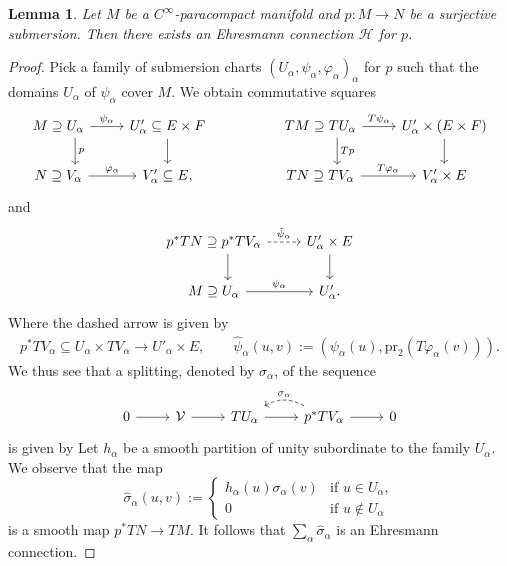 \documentclass[pdftex]{sigma}
\numberwithin{equation}{section}
\newtheorem{Lemma}[Theorem]{Lemma}
\newcommand{\cH}{\ensuremath{\mathcal{H}}}
\begin{document}
\begin{Lemma}\label{lem:ex_Ehresmann}
Let $M$ be a $C^\infty$-paracompact manifold and $p\colon M \rightarrow N$ be a surjective submersion. Then there exists an Ehresmann connection $\cH$ for $p$.
\end{Lemma}

\begin{proof}
 Pick a family of submersion charts $(U_\alpha, \psi_\alpha,\varphi_\alpha)_{\alpha}$ for $p$ such that the domains $U_\alpha$ of $\psi_\alpha$ cover $M$.
 We obtain commutative squares
 \begin{equation*}
 \begin{tikzcd}
 M \supseteq U_{\alpha} \ar[r,"\psi_{\alpha}"] \ar[d,"p", shift left=12pt] & U'_{\alpha}\subseteq E \times F \ar[d] & & TM \supseteq TU_{\alpha} \ar[r,"T\psi_{\alpha}"] \ar[d,"Tp", shift left=12pt] & U_{\alpha}' \times (E \times F) \ar[d] \\
 N \supseteq V_{\alpha} \ar[r,"\varphi_{\alpha}"] & V'_{\alpha} \subseteq E, & & TN \supseteq TV_{\alpha} \ar[r,"T\varphi_{\alpha}"] & V'_{\alpha} \times E
 \end{tikzcd}
 \end{equation*}
 and
 \begin{equation*}
 \begin{tikzcd}
 p^{*}TN\supseteq p^{*}TV_{\alpha} \ar[d, shift left=10pt] \ar[r, dashed,"\hat{\psi}_{\alpha}"] & U'_{\alpha} \times E \ar[d] \\
 M \supseteq U_{\alpha} \ar[r,"\psi_{\alpha}"] & U'_{\alpha}.
 \end{tikzcd}
 \end{equation*}
 Where the dashed arrow is given by
 \begin{align*}
 p^{*}TV_{\alpha} \subseteq U_{\alpha} \times TV_{\alpha} \rightarrow U'_{\alpha} \times E,\qquad \hat{\psi}_{\alpha}(u,v) := (\psi_{\alpha}(u), \mathrm{pr}_{2}(T\varphi_{\alpha}(v))).
 \end{align*}
 We thus see that a splitting, denoted by $\sigma_{\alpha}$, of the sequence
 \begin{equation*}
 \begin{tikzcd}
 0 \ar[r] & \mathcal{V} \ar[r] & TU_{\alpha} \ar[r] & p^{*}TV_{\alpha} \ar[r] \ar[l,bend right, dashed, "\sigma_{\alpha}"'] & 0
 \end{tikzcd}
 \end{equation*}
 is given by
 Let $h_{\alpha}$ be a smooth partition of unity subordinate to the family $U_{\alpha}$.
 We observe that the map
 \begin{equation*}
 \hat{\sigma}_{\alpha}(u,v) := \begin{cases}
 h_{\alpha}(u) \sigma_{\alpha}(v) & \text{if } u \in U_{\alpha}, \\
 0 & \text{if } u \notin U_{\alpha}
 \end{cases}
 \end{equation*}
 is a smooth map $p^{*}TN \rightarrow TM$.
 It follows that $\sum_{\alpha} \hat{\sigma}_{\alpha}$ is an Ehresmann connection.
\end{proof}
\end{document}
